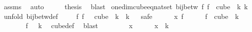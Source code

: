 \begin{isabellebody}
\ assms{\isacharparenleft}{\kern0pt}{}{\isacharparenright}{\kern0pt}\ \isamarkupfalse%
\ auto\isanewline
\ \ \isamarkupfalse%
\ \isamarkupfalse%
\ {\isacharquery}{\kern0pt}thesis\ \isamarkupfalse%
\ blast\isanewline
{}\isamarkupfalse%
%
\endisatagproof
{\isafoldproof}%
%
\isadelimproof
\isanewline
%
\endisadelimproof
\isanewline
{}\isamarkupfalse%
\ one{\isacharunderscore}{\kern0pt}dim{\isacharunderscore}{\kern0pt}cube{\isacharunderscore}{\kern0pt}eq{\isacharunderscore}{\kern0pt}nat{\isacharunderscore}{\kern0pt}set{\isacharcolon}{\kern0pt}\ {\isachardoublequoteopen}bij{\isacharunderscore}{\kern0pt}betw\ {\isacharparenleft}{\kern0pt}{\isasymlambda}f{\isachardot}{\kern0pt}\ f\ {}{\isacharparenright}{\kern0pt}\ {\isacharparenleft}{\kern0pt}cube\ {}\ k{\isacharparenright}{\kern0pt}\ {\isacharbraceleft}{\kern0pt}{\isachardot}{\kern0pt}{\isachardot}{\kern0pt}{\isacharless}{\kern0pt}k{\isacharbraceright}{\kern0pt}{\isachardoublequoteclose}\isanewline
%
\isadelimproof
%
\endisadelimproof
%
\isatagproof
{}\isamarkupfalse%
\ {\isacharparenleft}{\kern0pt}unfold\ bij{\isacharunderscore}{\kern0pt}betw{\isacharunderscore}{\kern0pt}def{\isacharparenright}{\kern0pt}\isanewline
\ \ \isamarkupfalse%
\ {\isacharasterisk}{\kern0pt}{\isacharcolon}{\kern0pt}\ {\isachardoublequoteopen}{\isacharparenleft}{\kern0pt}{\isasymlambda}f{\isachardot}{\kern0pt}\ f\ {}{\isacharparenright}{\kern0pt}\ {\isacharbackquote}{\kern0pt}\ cube\ {}\ k\ {\isacharequal}{\kern0pt}\ {\isacharbraceleft}{\kern0pt}{\isachardot}{\kern0pt}{\isachardot}{\kern0pt}{\isacharless}{\kern0pt}k{\isacharbraceright}{\kern0pt}{\isachardoublequoteclose}\isanewline
\ \ \isamarkupfalse%
{\isacharparenleft}{\kern0pt}safe{\isacharparenright}{\kern0pt}\isanewline
\ \ \ \ \isamarkupfalse%
\ x\ f\isanewline
\ \ \ \ \isamarkupfalse%
\ {\isachardoublequoteopen}f\ {\isasymin}\ cube\ {}\ k{\isachardoublequoteclose}\isanewline
\ \ \ \ \isamarkupfalse%
\ \isamarkupfalse%
\ {\isachardoublequoteopen}f\ {}\ {\isacharless}{\kern0pt}\ k{\isachardoublequoteclose}\ \isamarkupfalse%
\ cube{\isacharunderscore}{\kern0pt}def\ \isamarkupfalse%
\ blast\isanewline
\ \ \isamarkupfalse%
\isanewline
\ \ \ \ \isamarkupfalse%
\ x\isanewline
\ \ \ \ \isamarkupfalse%
\ {\isachardoublequoteopen}x\ {\isacharless}{\kern0pt}\ k{\isachardoublequoteclose}\isanewline

\end{isabellebody}
